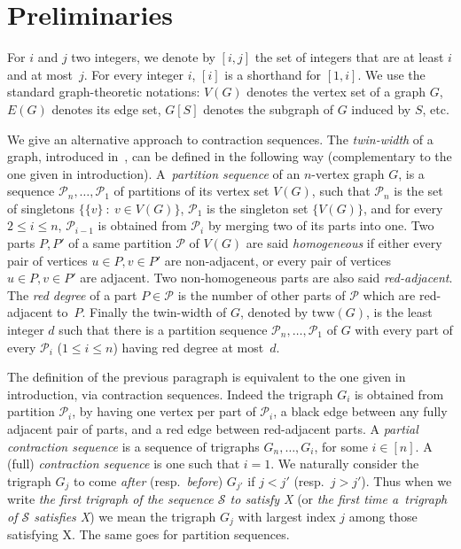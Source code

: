 \documentclass[a4paper,UKenglish,cleveref,hyperref,autoref]{lipics-v2021}
\newcommand{\tww}{\text{tww}}
\begin{document}
\section{Preliminaries}\label{sec:prelim}

For $i$ and $j$ two integers, we denote by $[i,j]$ the set of integers that are at least $i$ and at most~$j$.
For every integer $i$, $[i]$ is a shorthand for $[1,i]$.
We use the standard graph-theoretic notations: $V(G)$ denotes the vertex set of a graph $G$, $E(G)$ denotes its edge set, $G[S]$ denotes the subgraph of $G$ induced by $S$, etc.
 
We give an alternative approach to contraction sequences.
The \emph{twin-width} of a graph, introduced in~\cite{twin-width1}, can be defined in the following way (complementary to the one given in introduction).
A~\emph{partition sequence} of an $n$-vertex graph $G$, is a sequence $\mathcal P_n, \ldots, \mathcal P_1$ of partitions of its vertex set $V(G)$, such that $\mathcal P_n$ is the set of singletons $\{\{v\}~:~v \in V(G)\}$, $\mathcal P_1$ is the singleton set $\{V(G)\}$, and for every $2 \leqslant i \leqslant n$, $\mathcal P_{i-1}$ is obtained from $\mathcal P_i$ by merging two of its parts into one.
Two parts $P, P'$ of a same partition $\mathcal P$ of $V(G)$ are said \emph{homogeneous} if either every pair of vertices $u \in P, v \in P'$ are non-adjacent, or every pair of vertices $u \in P, v \in P'$ are adjacent.
Two non-homogeneous parts are also said \emph{red-adjacent}.
The \emph{red degree} of a part $P \in \mathcal P$ is the number of other parts of $\mathcal P$ which are red-adjacent to~$P$. 
Finally the twin-width of $G$, denoted by $\tww(G)$, is the least integer $d$ such that there is a partition sequence $\mathcal P_n, \ldots, \mathcal P_1$ of $G$ with every part of every $\mathcal P_i$ ($1 \leqslant i \leqslant n$) having red degree at most~$d$.

The definition of the previous paragraph is equivalent to the one given in introduction, via contraction sequences.
Indeed the trigraph $G_i$ is obtained from partition $\mathcal P_i$, by having one vertex per part of $\mathcal P_i$, a black edge between any fully adjacent pair of parts, and a red edge between red-adjacent parts. 
A \emph{partial contraction sequence} is a sequence of trigraphs $G_n, \ldots, G_i$, for some $i \in [n]$.
A (full) \emph{contraction sequence} is one such that $i=1$.
We naturally consider the trigraph $G_j$ to come \emph{after} (resp.~\emph{before}) $G_{j'}$ if $j<j'$ (resp.~$j>j'$).
Thus when we write \emph{the first trigraph of the sequence $\mathcal S$ to satisfy X} (or \emph{the first time a~trigraph of $\mathcal S$ satisfies X}) we mean the trigraph $G_j$ with largest index $j$ among those satisfying X.
The same goes for partition sequences.
\end{document}

